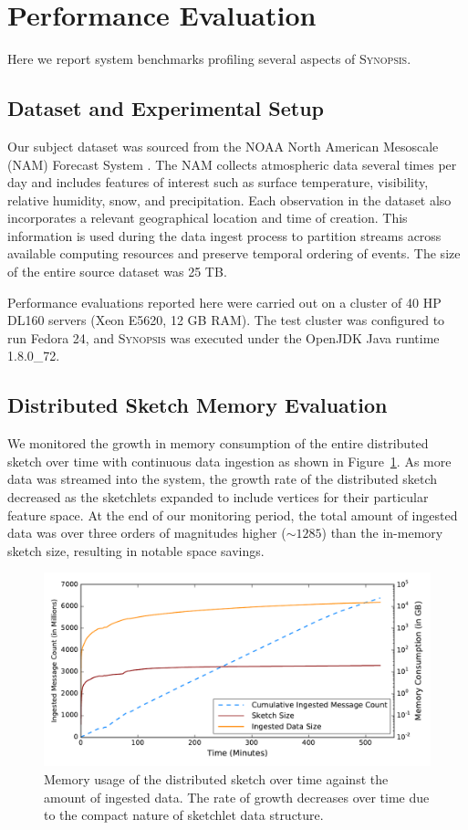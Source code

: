 \section{Performance Evaluation}
Here we report system benchmarks profiling several aspects of \textsc{Synopsis}.
\label{sec:performance}
\subsection{Dataset and Experimental Setup}
Our subject dataset was sourced from the NOAA North American Mesoscale (NAM) Forecast System \cite{noaa_nam}.  The NAM collects atmospheric data several times per day and includes features of interest such as surface temperature, visibility, relative humidity, snow, and precipitation. Each observation in the dataset also incorporates a relevant geographical location and time of creation. This information is used during the data ingest process to partition streams across available computing resources and preserve temporal ordering of events. The size of the entire source dataset was 25 TB.

Performance evaluations reported here were carried out on a cluster of 40 HP DL160 servers (Xeon E5620, 12 GB RAM). The test cluster was configured to run Fedora 24, and \textsc{Synopsis} was executed under the OpenJDK Java runtime 1.8.0\_72.
%
\subsection{Distributed Sketch Memory Evaluation}
We monitored the growth in memory consumption of the entire distributed sketch over time with continuous data ingestion as shown in Figure~\ref{fig:dist-sketch-mem-usage}. As more data was streamed into the system, the growth rate of the distributed sketch decreased as the sketchlets expanded to include vertices for their particular feature space.  At the end of our monitoring period, the total amount of ingested data was over three orders of magnitudes higher ($\sim 1285$) than the in-memory sketch size, resulting in notable space savings.
%
\begin{figure}[h!]
    \centerline{\includegraphics[width=\linewidth]{figures/ing-and-mem-usage.pdf}}
    \caption{Memory usage of the distributed sketch over time against the amount of ingested data. The rate of growth decreases over time due to the compact nature of sketchlet data structure.}
    \label{fig:dist-sketch-mem-usage}
\end{figure}
%
